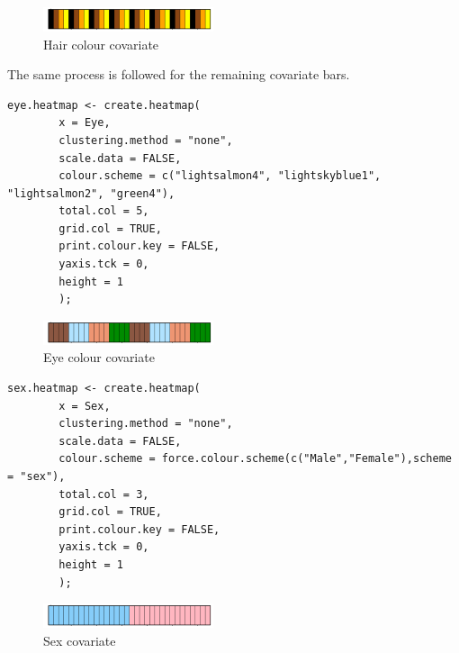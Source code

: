 \documentclass[letterpaper]{article}
\begin{document}
\begin{figure}[!ht]
  \begin{center}
     \includegraphics[width=50mm]{Figures/ex1_hair_heatmap.png}
     \caption{Hair colour covariate}
     \label{fig:picture}
  \end{center}
\end{figure}

The same process is followed for the remaining covariate bars.

\begin{verbatim}
eye.heatmap <- create.heatmap(
        x = Eye,
        clustering.method = "none",
        scale.data = FALSE, 
        colour.scheme = c("lightsalmon4", "lightskyblue1", "lightsalmon2", "green4"),
        total.col = 5,
        grid.col = TRUE,
        print.colour.key = FALSE,
        yaxis.tck = 0,
        height = 1
        );
\end{verbatim}

\begin{figure}[!ht]
  \begin{center}
     \includegraphics[width=50mm]{Figures/ex1_eye_heatmap.png}
     \caption{Eye colour covariate}
     \label{fig:picture}
  \end{center}
\end{figure}

\begin{verbatim}
sex.heatmap <- create.heatmap(
        x = Sex,
        clustering.method = "none",
        scale.data = FALSE,
        colour.scheme = force.colour.scheme(c("Male","Female"),scheme = "sex"),
        total.col = 3,
        grid.col = TRUE,
        print.colour.key = FALSE,
        yaxis.tck = 0,
        height = 1
        );
\end{verbatim}

\begin{figure}[!ht]
  \begin{center}
     \includegraphics[width=50mm]{Figures/ex1_sex_heatmap.png}
     \caption{Sex covariate}
     \label{fig:picture}
  \end{center}
\end{figure}
\end{document}
